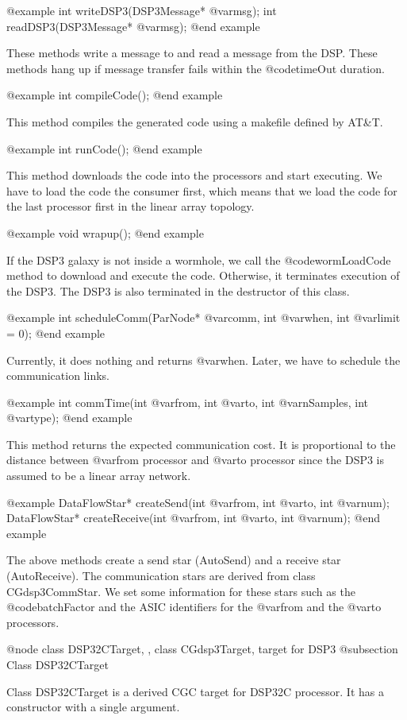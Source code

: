 {@example
int writeDSP3(DSP3Message* @var{msg});
int readDSP3(DSP3Message* @var{msg});
@end example

These methods write a message to and read a message from the DSP.
These methods hang up if message transfer fails within the @code{timeOut}
duration.

@example
int compileCode();
@end example

This method compiles the generated code using a makefile defined by AT&T.

@example
int runCode();
@end example

This method downloads the code into the processors and start executing.
We have to load the code the consumer first, which means that we load the
code for the last processor first in the linear array topology.

@example
void wrapup();
@end example

If the DSP3 galaxy is not inside a wormhole, we call the @code{wormLoadCode}
method to download and execute the code. Otherwise, it terminates execution
of the DSP3. The DSP3 is also terminated in the destructor of this class.

@example
int scheduleComm(ParNode* @var{comm}, int @var{when}, int @var{limit} = 0);
@end example

Currently, it does nothing and returns @var{when}. Later, we have to schedule
the communication links.

@example
int commTime(int @var{from}, int @var{to}, int @var{nSamples}, int @var{type});
@end example

This method returns the expected communication cost. It is proportional to
the distance between @var{from} processor and @var{to} processor since the
DSP3 is assumed to be a linear array network.

@example
DataFlowStar* createSend(int @var{from}, int @var{to}, int @var{num});
DataFlowStar* createReceive(int @var{from}, int @var{to}, int @var{num});
@end example

The above methods create a send star (AutoSend) and 
a receive star (AutoReceive). The communication stars are derived from
class CGdsp3CommStar. We set some information for these stars
such as the @code{batchFactor}
and the ASIC identifiers for the @var{from} and the @var{to} processors.

@node class DSP32CTarget, , class CGdsp3Target, target for DSP3
@subsection Class DSP32CTarget

Class DSP32CTarget is a derived CGC target for DSP32C processor.
It has a constructor with a single argument.

}
